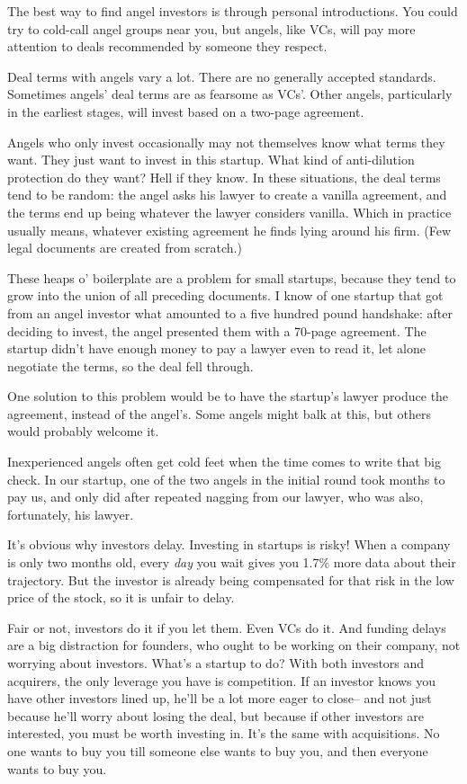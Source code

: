 The best way to find angel investors is through personal introductions.
You could try to cold-call angel groups near you, but angels, like
VCs, will pay more attention to deals recommended by someone they
respect.

Deal terms with angels vary a lot.  There are no generally accepted
standards.  Sometimes angels' deal terms are as fearsome as VCs'.
Other angels, particularly in the earliest stages, will invest based
on a two-page agreement.

Angels who only invest occasionally may not themselves know what
terms they want.  They just want to invest in this startup.  What
kind of anti-dilution protection do they want?  Hell if they know.
In these situations, the deal terms tend to be random: the angel
asks his lawyer to create a vanilla agreement, and the terms end
up being whatever the lawyer considers vanilla.  Which in practice
usually means, whatever existing agreement he finds lying around
his firm.  (Few legal documents are created from scratch.)

These heaps o' boilerplate are a problem for small startups, because
they tend to grow into the union of all preceding documents.  I
know of one startup that got from an angel investor what amounted
to a five hundred pound handshake: after deciding to invest, the
angel presented them with a 70-page agreement.  The startup didn't
have enough money to pay a lawyer even to read it, let alone negotiate
the terms, so the deal fell through.

One solution to this problem would be to have the startup's lawyer
produce the agreement, instead of the angel's.  Some angels might
balk at this, but others would probably welcome it.

Inexperienced angels often get cold feet when the time comes to
write that big check.  In our startup, one of the two angels in the
initial round took months to pay us, and only did after repeated
nagging from our lawyer, who was also, fortunately, his lawyer.

It's obvious why investors delay.  Investing in startups is risky!
When a company is only two months old, every \emph{day} you wait
gives you 1.7\% more data about their trajectory.  But the investor
is already being compensated for that risk in the low price of the
stock, so it is unfair to delay.

Fair or not, investors do it if you let them.  Even VCs do it.  And
funding delays are a big distraction for founders, who ought to be
working on their company, not worrying about investors.  What's a
startup to do?  With both investors and acquirers, the only leverage
you have is competition.  If an investor knows you have other
investors lined up, he'll be a lot more eager to close-- and not
just because he'll worry about losing the deal, but because if other
investors are interested, you must be worth investing in.  It's the
same with acquisitions.  No one wants to buy you till someone else
wants to buy you, and then everyone wants to buy you.

